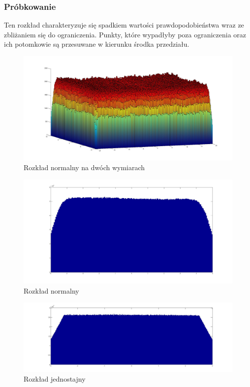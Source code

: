 \documentclass{mini}
\begin{document}
\subsubsection*{Próbkowanie}
Ten rozkład charakteryzuje się spadkiem wartości prawdopodobieństwa wraz ze zbliżaniem się do ograniczenia. Punkty, które wypadłyby poza ograniczenia oraz ich potomkowie są przesuwane w kierunku środka przedziału.

\begin{figure}[H]
\centering
\includegraphics[width=\textwidth]{s_n_10M_2__20_20__10_10_4_2}
\caption{Rozkład normalny na dwóch wymiarach}
\end{figure}

\begin{figure}[H]
\centering
\includegraphics[width=\textwidth]{s_n_10M_1__5_5}
\caption{Rozkład normalny}
\end{figure}

\begin{figure}[H]
\centering
\includegraphics[width=\textwidth]{s_j_20M_1__3_3}
\caption{Rozkład jednostajny}
\label{bladzenie:probkowanie1dj}
\end{figure}
\end{document}
